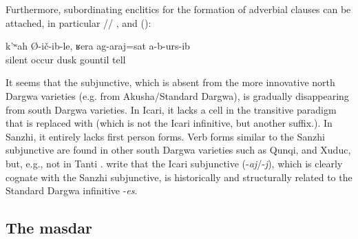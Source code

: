 Furthermore, subordinating enclitics for the formation of adverbial clauses can be attached, in particular \slash{}\slash{}  ,   and   ():
%
\begin{exe}
	\ex	\label{ex:‎‎‎He remained silent, until it became dark he did not tell}
	\gll	k'ʷah	Ø-ič-ib-le,	ʁera	ag-araj=sat	a-b-urs-ib\\
		silent	occur	dusk	gountil	tell\\
	\glt	{}
\end{exe}

It seems that the subjunctive, which is absent from the more innovative north Dargwa varieties (e.g. from Akusha\slash Standard Dargwa), is gradually disappearing from south Dargwa varieties. In Icari, it lacks a cell in the transitive paradigm that is replaced with  (which is not the Icari infinitive, but another suffix.). In Sanzhi, it entirely lacks first person forms. Verb forms similar to the Sanzhi subjunctive are found in other south Dargwa varieties such as Qunqi, and Xuduc, but, e.g., not in Tanti \citep[136]{Sumbatova.Lander2014}. \citet[107]{Sumbatova.Mutalov2003} write that the Icari subjunctive (-\textit{aj}\slash -\textit{j}), which is clearly cognate with the Sanzhi subjunctive, is historically and structurally related to the Standard Dargwa infinitive -\textit{es}. 





\subsection{The masdar}
\label{ssec:The masdar}

